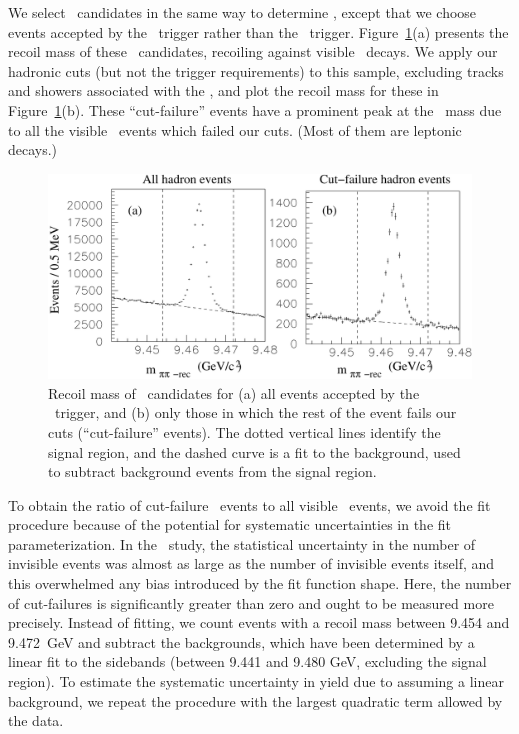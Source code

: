 \documentclass{cornell}
\begin{document}
We select \pipi\ candidates in the same way to determine \ecuts,
except that we choose events accepted by the \hadron\ trigger rather
than the \twotrack\ trigger.  Figure~\ref{pipihadron}(a) presents the
recoil mass of these \pipi\ candidates, recoiling against visible \us\
decays.  We apply our hadronic cuts (but not the trigger requirements)
to this sample, excluding tracks and showers associated with the
\pipi, and plot the recoil mass for these in Figure~\ref{pipihadron}(b).  These ``cut-failure'' events have a prominent
peak at the \us\ mass due to all the visible \us\ events which failed
our cuts.  (Most of them are leptonic decays.)

\begin{figure}[p]
  \begin{center}
    \includegraphics[width=\linewidth]{plots/pipihadron}
  \end{center}
  \caption{\label{pipihadron} Recoil mass of \pipi\ candidates for (a)
  all events accepted by the \hadron\ trigger, and (b) only those in
  which the rest of the event fails our cuts (``cut-failure'' events).
  The dotted vertical lines identify the signal region, and the dashed
  curve is a fit to the background, used to subtract background events
  from the signal region.}
\end{figure}

To obtain the ratio of cut-failure \us\ events to all visible \us\
events, we avoid the fit procedure because of the potential for
systematic uncertainties in the fit parameterization.  In the \evis\
study, the statistical uncertainty in the number of invisible events
was almost as large as the number of invisible events itself, and this
overwhelmed any bias introduced by the fit function shape.  Here, the
number of cut-failures is significantly greater than zero and ought to
be measured more precisely.  Instead of fitting, we count events with
a recoil mass between 9.454 and 9.472~GeV and subtract the 
backgrounds, which have been determined by a linear fit to the sidebands
(between 9.441 and 9.480 GeV, excluding the signal region).  To
estimate the systematic uncertainty in yield due to assuming a linear
background, we repeat the procedure with the largest quadratic term
allowed by the data.
\end{document}
